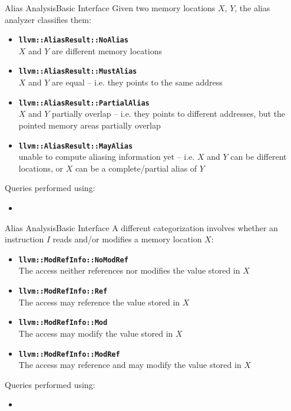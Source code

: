 \begin{frame}{Alias Analysis}{Basic Interface}
Given two memory locations $X$, $Y$, the alias analyzer classifies them:\\
\vfill
\begin{itemize}
\item \texttt{\textbf{llvm::AliasResult::NoAlias}}\\
			$X$ and $Y$ \alert{are
      different} memory locations
\vfill
\item \texttt{\textbf{llvm::AliasResult::MustAlias}}\\
			$X$ and $Y$ \alert{are equal}
      -- i.e. they points to the same address
\vfill
\item \texttt{\textbf{llvm::AliasResult::PartialAlias}}\\
			$X$ and $Y$
      \alert{partially overlap} -- i.e. they points to different addresses,
      but the pointed memory areas partially overlap
\vfill
\item \texttt{\textbf{llvm::AliasResult::MayAlias}}\\
			\alert{unable to compute}
      aliasing information yet -- i.e. $X$ and $Y$ can be different locations,
      or $X$ can be a complete/partial alias of $Y$
\end{itemize}

\vfill
Queries performed using:
\begin{itemize}
\item {}
\end{itemize}
\end{frame}


\begin{frame}{Alias Analysis}{Basic Interface}
A different categorization involves whether an instruction $I$
\alert{reads and/or modifies} a memory location $X$:\\
\vfill
\begin{itemize}
\item \texttt{\textbf{llvm::ModRefInfo::NoModRef}}\\
			The access neither references nor modifies the value stored in $X$
\vfill
\item \texttt{\textbf{llvm::ModRefInfo::Ref}}\\
			The access may reference the value stored in $X$ 
\vfill
\item \texttt{\textbf{llvm::ModRefInfo::Mod}}\\
			The access may modify the value stored in $X$ 
\vfill
\item \texttt{\textbf{llvm::ModRefInfo::ModRef}}\\
			The access may reference and may modify the value stored in $X$
\end{itemize}

\vfill
Queries performed using:
\begin{itemize}
\item {}
\end{itemize}
\end{frame}


